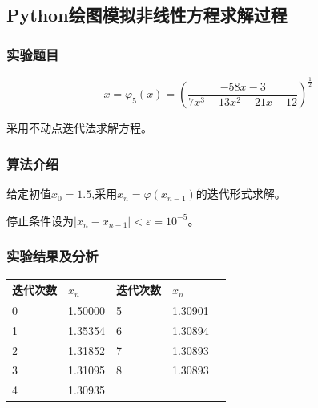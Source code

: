 \documentclass[UTF8]{ctexart}
\begin{document}
\subsection{Python绘图模拟非线性方程求解过程}
\subsubsection{实验题目}
\begin{equation}\nonumber
  x=\varphi_{5}(x)=\left(\frac{-58 x-3}{7 x^{3}-13 x^{2}-21 x-12}\right)^{\frac{1}{2}}
\end{equation}

采用不动点迭代法求解方程。
\subsubsection{算法介绍}
给定初值$x_0 = 1.5$,采用$x_{n}=\varphi\left(x_{n-1}\right)$的迭代形式求解。

停止条件设为$\left|x_{n}-x_{n-1}\right|<\varepsilon=10^{-5}$。

\subsubsection{实验结果及分析}
\begin{table}[H]
  \vspace{0pt}
  \centering
  \begin{tabular}{lllll}
      \hline
      迭代次数 & $x_n$ & 迭代次数 & $x_n$\\
      \hline
      0 & 1.50000 & 5 & 1.30901\\
      1 & 1.35354 & 6 & 1.30894\\
      2 & 1.31852 & 7 & 1.30893\\
      3 & 1.31095 & 8 & 1.30893\\
      4 & 1.30935\\
      \hline       
  \end{tabular}
\end{table}
\end{document}
